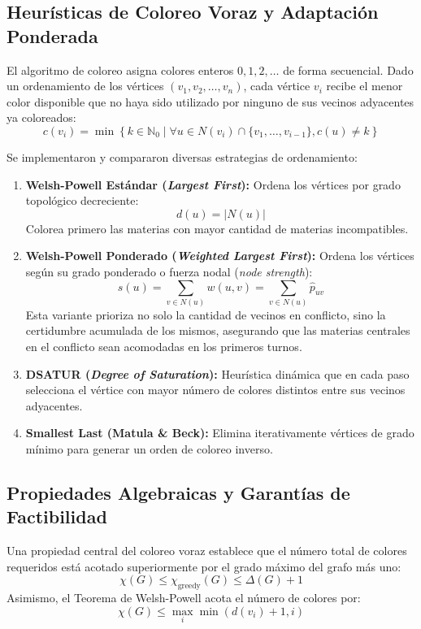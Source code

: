 \documentclass[11pt,a4paper]{article}
\begin{document}
\subsection{Heurísticas de Coloreo Voraz y Adaptación Ponderada}
El algoritmo de coloreo asigna colores enteros $0, 1, 2, \dots$ de forma secuencial. Dado un ordenamiento de los vértices $(v_1, v_2, \dots, v_n)$, cada vértice $v_i$ recibe el menor color disponible que no haya sido utilizado por ninguno de sus vecinos adyacentes ya coloreados:
\begin{equation}
    c(v_i) = \min \left\{ k \in \mathbb{N}_0 \mid \forall u \in N(v_i) \cap \{v_1, \dots, v_{i-1}\}, c(u) \neq k \right\}
\end{equation}

Se implementaron y compararon diversas estrategias de ordenamiento:
\begin{enumerate}
    \item \textbf{Welsh-Powell Estándar (\textit{Largest First}):} Ordena los vértices por grado topológico decreciente:
    \begin{equation}
        d(u) = |N(u)|
    \end{equation}
    Colorea primero las materias con mayor cantidad de materias incompatibles.
    \item \textbf{Welsh-Powell Ponderado (\textit{Weighted Largest First}):} Ordena los vértices según su grado ponderado o fuerza nodal (\textit{node strength}):
    \begin{equation}
        s(u) = \sum_{v \in N(u)} w(u, v) = \sum_{v \in N(u)} \hat{p}_{uv}
    \end{equation}
    Esta variante prioriza no solo la cantidad de vecinos en conflicto, sino la certidumbre acumulada de los mismos, asegurando que las materias centrales en el conflicto sean acomodadas en los primeros turnos.
    \item \textbf{DSATUR (\textit{Degree of Saturation}):} Heurística dinámica que en cada paso selecciona el vértice con mayor número de colores distintos entre sus vecinos adyacentes.
    \item \textbf{Smallest Last (Matula \& Beck):} Elimina iterativamente vértices de grado mínimo para generar un orden de coloreo inverso.
\end{enumerate}

\subsection{Propiedades Algebraicas y Garantías de Factibilidad}
Una propiedad central del coloreo voraz establece que el número total de colores requeridos está acotado superiormente por el grado máximo del grafo más uno:
\begin{equation}
    \chi(G) \le \chi_{\text{greedy}}(G) \le \Delta(G) + 1
\end{equation}
Asimismo, el Teorema de Welsh-Powell acota el número de colores por:
\begin{equation}
    \chi(G) \le \max_{i} \min(d(v_i) + 1, i)
\end{equation}
\end{document}

